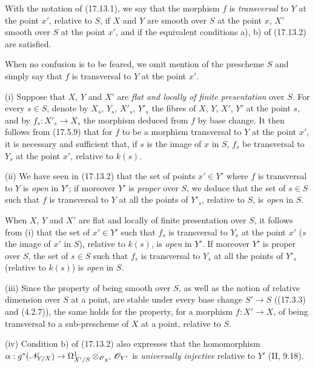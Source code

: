 \begin{definition}[17.13.3]\label{IV.17.13.3}
With the notation of (17.13.1), we say that the morphism $f$ is \emph{transversal} to $Y$ at the point $x'$, relative to $S$, if $X$ and $Y$ are smooth over $S$ at the point $x$, $X'$ smooth over $S$ at the point $x'$, and if the equivalent conditions a), b) of (17.13.2) are satisfied.
\end{definition}

When no confusion is to be feared, we omit mention of the prescheme $S$ and simply say that $f$ is transversal to $Y$ at the point $x'$.

\begin{remarks}[17.13.4]
\label{IV.17.13.4}
(i) Suppose that $X$, $Y$ and $X'$ are \emph{flat and locally of finite presentation} over $S$. For every $s\in S$, denote by $X_s$, $Y_s$, $X'_s$, $Y'_s$ the fibres of $X$, $Y$, $X'$, $Y'$ at the point $s$, and by $f_s:X'_s\to X_s$ the morphism deduced from $f$ by base change. It then follows from (17.5.9) that for $f$ to be a morphism transversal to $Y$ at the point $x'$, it is necessary and sufficient that, if $s$ is the image of $x$ in $S$, $f_s$ be transversal to $Y_s$ at the point $x'$, relative to $k(s)$.

(ii) We have seen in (17.13.2) that the set of points $x'\in Y'$ where $f$ is transversal to $Y$ is \emph{open} in $Y'$; if moreover $Y'$ is \emph{proper} over $S$, we deduce that the set of $s\in S$ such that $f$ is transversal to $Y$ at all the points of $Y'_s$, relative to $S$, is \emph{open} in $S$.

When $X$, $Y$ and $X'$ are flat and locally of finite presentation over $S$, it follows from (i) that the set of $x'\in Y'$ such that $f_s$ is transversal to $Y_s$ at the point $x'$ ($s$ the image of $x'$ in $S$), relative to $k(s)$, is \emph{open} in $Y'$. If moreover $Y'$ is proper over $S$, the set of $s\in S$ such that $f_s$ is transversal to $Y_s$ at all the points of $Y'_s$ (relative to $k(s)$) is \emph{open} in $S$.

(iii) Since the property of being smooth over $S$, as well as the notion of relative dimension over $S$ at a point, are stable under every base change $S'\to S$ ((17.3.3) and (4.2.7)), the same holds for the property, for a morphism $f:X'\to X$, of being transversal to a sub-prescheme of $X$ at a point, relative to $S$.


(iv) Condition b) of (17.13.2) also expresses that the homomorphism $\alpha:g^*(\mathscr{N}_{Y/X})\to\Omega^1_{X'/S}\otimes_{\mathscr{O}_{X'}}\mathscr{O}_{Y'}$ is \emph{universally injective} relative to $Y'$ (II, 9.18).
\end{remarks}

